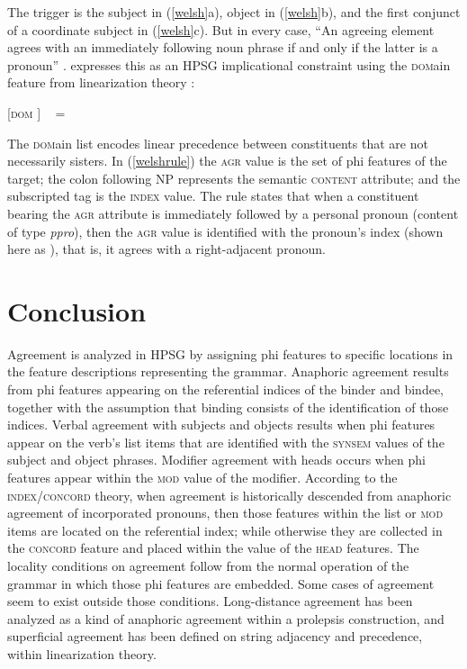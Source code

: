 \documentclass[output=paper
 	        ,biblatex
                ,babelshorthands
                ,newtxmath
                ,draftmode
                ,colorlinks, citecolor=brown
]{langscibook}
\begin{document}
\noindent
The trigger is the subject in (\ref{welsh}a), object in (\ref{welsh}b), and the first conjunct of a coordinate subject in (\ref{welsh}c).  But in every case, ``An agreeing element agrees with an immediately following noun phrase if and only if the latter is a pronoun'' \citep[example\,(48)]{Borsley:2009}. \citet[example\,(99)]{Borsley:2009} expresses this as an HPSG implicational constraint using the \textsc{dom}ain feature from linearization theory \citep{reape:1994,Mueller95c,Mueller99a,Kathol:2000}:

\begin{exe}
\ex \label{welshrule}
{}[\textsc{dom}   ]  %
\impl  \  = 
\end{exe}

\noindent
The \textsc{dom}ain list encodes linear precedence between constituents that are not necessarily sisters.  In (\ref{welshrule}) the \textsc{agr} value is the set of phi features of the target; the colon following NP represents the semantic \textsc{content} attribute; and the subscripted tag  is the \textsc{index} value.  The rule states that when a constituent bearing the \textsc{agr} attribute is immediately followed by a personal pronoun (content of type \textit{ppro}), then the \textsc{agr} value is identified with the pronoun's index (shown here as  ), that is, it agrees with a right-adjacent pronoun.  



\section{Conclusion} 

Agreement is analyzed in HPSG by assigning phi features to specific locations in the feature descriptions representing the grammar.  Anaphoric agreement results from phi features appearing on the referential indices of the binder and bindee, together with the assumption that binding consists of the identification of those indices.  Verbal agreement with subjects and objects results when phi features appear on the verb's \argst list items that are identified with the \textsc{synsem} values of the subject and object phrases.  Modifier agreement with heads occurs when phi features appear within the \textsc{mod} value of the modifier.  According to the \textsc{index}/\textsc{concord} theory, when agreement is historically descended from anaphoric agreement of incorporated pronouns, then those features within the \argst list or \textsc{mod} items are located  on the referential index; while otherwise they are collected in the \textsc{concord} feature and placed within the value of the \textsc{head} features.   The locality conditions on agreement follow from the normal operation of the grammar in which those phi features are embedded.  Some cases of agreement seem to exist outside those conditions.  Long-distance agreement has been analyzed as a kind of anaphoric agreement within a prolepsis construction, and superficial agreement has been defined on string adjacency and precedence, within linearization theory.  
\end{document}
